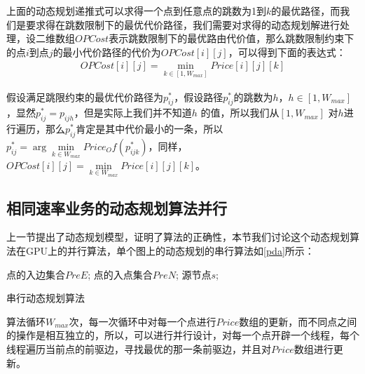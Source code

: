 上面的动态规划递推式可以求得一个点到任意点的跳数为1到$k$的最优路径，而我们是要求得在跳数限制下的最优代价路径，我们需要对求得的动态规划解进行处理，设二维数组$OPCost$表示跳数限制下的最优路由代价值，那么跳数限制约束下的点$i$到点$j$的最小代价路径的代价为$OPCost[i][j]$，可以得到下面的表达式：
\begin{equation}\label{best}
\begin{split}
OPCost[i][j]=\min\limits_{k \in [1,W_{max}]}{Price[i][j][k]}
\end{split}
\end{equation}

假设满足跳限约束的最优代价路径为$p_{ij}^*$，假设路径$p_{ij}^*$的跳数为$h$，$h \in [1,W_{max}]$，显然$p_{ij}^*=p_{ijh}$，但是实际上我们并不知道$h$ 的值，所以我们从$[1,W_{max}]$ 对$h$进行遍历，那么$p_{ij}^*$肯定是其中代价最小的一条，所以$p_{ij}^*=\arg\min\limits_{k \in W_{max}}{Price_Of(p_{ijk}^*)}$，同样，$OPCost[i][j]=\min\limits_{k \in W_{max}}{Price[i][j][k]}$。

\subsection{相同速率业务的动态规划算法并行}
上一节提出了动态规划模型，证明了算法的正确性，本节我们讨论这个动态规划算法在GPU上的并行算法，单个图上的动态规划的串行算法如\ref{pda}所示：
\begin{algorithm}[t]
\begin{algorithmic}[1]
\Require
点的入边集合$PreE$;
点的入点集合$PreN$;
源节点$s$;
\EndFor
\EndFor
\end{algorithmic}
\caption{{串行动态规划算法}}
\label{pda}
\end{algorithm}

算法循环$W_{max}$次，每一次循环中对每一个点进行$Price$数组的更新，而不同点之间的操作是相互独立的，所以，可以进行并行设计，对每一个点开辟一个线程，每个线程遍历当前点的前驱边，寻找最优的那一条前驱边，并且对$Price$数组进行更新。

